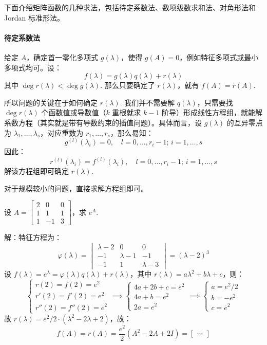 下面介绍矩阵函数的几种求法，包括待定系数法、数项级数求和法、对角形法和 Jordan 标准形法。

\paragraph{待定系数法}

给定 $A$，确定首一零化多项式 $g(\lambda)$，使得 $g(A)=0$，例如特征多项式或最小多项式均可。设：
\[
f(\lambda)=g(\lambda)q(\lambda)+r(\lambda)
\]
其中 $\deg r(\lambda)<\deg g(\lambda)$. 那么只要确定了 $r(\lambda)$，就有 $f(A)=r(A)$.

所以问题的关键在于如何确定 $r(\lambda)$. 我们并不需要解 $q(\lambda)$，只需要找 $\deg r(\lambda)$ 个函数值或导数值（$k$ 重根就求 $k-1$ 阶导）形成线性方程组，就能解系数方程（其实就是带有导数约束的插值问题）。具体而言，设 $g(\lambda)$ 的互异零点为 $\lambda_1,\ldots,\lambda_s$，对应重数为 $r_1,\ldots,r_s$，那么易知：
\[
    g^{(l)}(\lambda_i)=0,\quad l=0,\ldots,r_i-1;\,i=1,\ldots,s
\]
因此：
\[
    r^{(l)}(\lambda_i)=f^{(l)}(\lambda_i),\quad l=0,\ldots,r_i-1;\,i=1,\ldots,s
\]
解该方程组即可确定 $r(\lambda)$.

对于规模较小的问题，直接求解方程组即可。

\begin{example}
设 $A=\begin{bmatrix}2&0&0\\1&1&1\\1&-1&3\end{bmatrix}$，求 $e^A$.

解：特征方程为：
\[
\varphi(\lambda)=\begin{vmatrix}\lambda-2&0&0\\-1&\lambda-1&-1\\-1&1&\lambda-3\end{vmatrix}=(\lambda-2)^3
\]
设 $f(\lambda)=e^\lambda=\varphi(\lambda)q(\lambda)+r(\lambda)$，其中 $r(\lambda)=a\lambda^2+b\lambda+c$，则：
\[
    \begin{cases}
    r(2)=f(2)=e^2\\
    r'(2)=f'(2)=e^2\\
    r''(2)=f''(2)=e^2
    \end{cases}\implies
    \begin{cases}
    4a+2b+c=e^2\\
    4a+b=e^2\\
    2a=e^2
    \end{cases}\implies
    \begin{cases}
    a=e^2/2\\
    b=-e^2\\
    c=e^2
    \end{cases}
\]
故 $r(\lambda)=e^2/2\cdot(\lambda^2-2\lambda+2)$，故：
\[
    f(A)=r(A)=\frac{e^2}{2}(A^2-2A+2I)=\begin{bmatrix}\cdots\end{bmatrix}
\]
\end{example}

